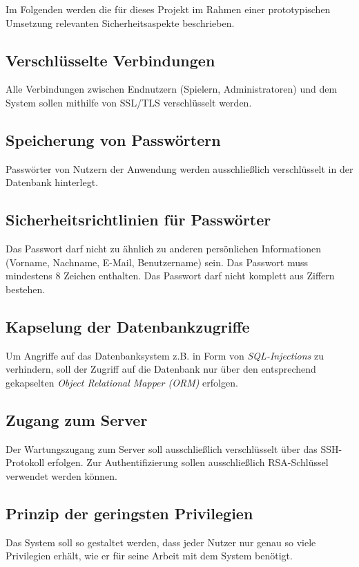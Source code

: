 \documentclass[a4paper,11pt,listof=numbered,glossary=totoc,parskip=half,toc=bib]{scrreprt}
\begin{document}
	Im Folgenden werden die für dieses Projekt im Rahmen einer prototypischen Umsetzung relevanten Sicherheitsaspekte beschrieben.
	
	\subsection{Verschlüsselte Verbindungen}
	Alle Verbindungen zwischen Endnutzern (Spielern, Administratoren) und dem System sollen mithilfe von SSL/TLS verschlüsselt werden.
	

	\subsection{Speicherung von Passwörtern}
	Passwörter von Nutzern der Anwendung werden ausschließlich verschlüsselt in der Datenbank hinterlegt.
	
	\subsection{Sicherheitsrichtlinien für Passwörter}
	 Das Passwort darf nicht zu ähnlich zu anderen persönlichen Informationen (Vorname, Nachname, E-Mail, Benutzername) sein.
    Das Passwort muss mindestens 8 Zeichen enthalten.
    Das Passwort darf nicht komplett aus Ziffern bestehen.	
    
    \subsection{Kapselung der Datenbankzugriffe}
    Um Angriffe auf das Datenbanksystem z.B. in Form von \textit{SQL-Injections} zu verhindern, soll der Zugriff auf die Datenbank nur über den entsprechend gekapselten \textit{Object Relational Mapper (ORM)} erfolgen.
	
	\subsection{Zugang zum Server}
	Der Wartungszugang zum Server soll ausschließlich verschlüsselt über das SSH-Protokoll erfolgen. Zur Authentifizierung sollen ausschließlich RSA-Schlüssel verwendet werden können.
	
	\subsection{Prinzip der geringsten Privilegien}
	Das System soll so gestaltet werden, dass jeder Nutzer nur genau so viele Privilegien erhält, wie er für seine Arbeit mit dem System benötigt.
	
\end{document}
